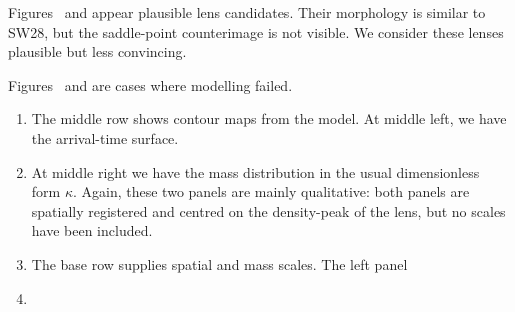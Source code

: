 Figures~ and  appear plausible lens
candidates.  Their morphology is similar to SW28, but the saddle-point
counterimage is not visible.  We consider these lenses plausible but
less convincing.

Figures~ and  are cases where modelling
failed.

\begin{enumerate}
\item The middle row shows contour maps from the model.  At middle
  left, we have the arrival-time surface.
\item At middle right we have the mass distribution in the usual
  dimensionless form $\kappa$.  Again, these two panels are mainly
  qualitative: both panels are spatially registered and centred on the
  density-peak of the lens, but no scales have been included.
\item The base row supplies spatial and mass scales.  The left panel

\item 
\end{enumerate}

